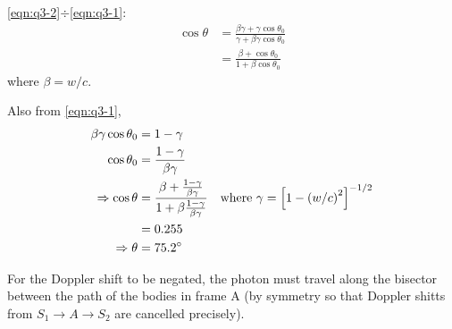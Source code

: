 \begin{parts}
	\eqref{eqn:q3-2}$\div$\eqref{eqn:q3-1}:
	\begin{align*}
		\cos\theta &= \frac{\beta\gamma + \gamma\cos\theta_0}{\gamma + \beta\gamma\cos\theta_0} \\
		&= \frac{\beta + \cos\theta_0}{1 + \beta\cos\theta_0}
	\end{align*}
	where $\beta=w/c$.
	
	Also from \eqref{eqn:q3-1},
	\begin{align*}
		\beta\gamma\cos\theta_0 &= 1-\gamma \\
		\cos\theta_0 &= \frac{1-\gamma}{\beta\gamma} \\
		\Rightarrow \cos\theta &= \frac{\beta + \frac{1-\gamma}{\beta\gamma}}{1 + \beta\frac{1-\gamma}{\beta\gamma}} \textnormal{\hspace{1em}where $\gamma = \left[1-\left(w/c\right)^2\right]^{-1/2}$} \\
		&= \num{0.255} \\
		\Rightarrow \theta &= \SI{75.2}{\degree}
	\end{align*}
	
	For the Doppler shift to be negated, the photon must travel along the bisector between the path of the bodies in frame A (by symmetry so that Doppler shitts from $S_1 \to A \to S_2$ are cancelled precisely).
\end{parts}